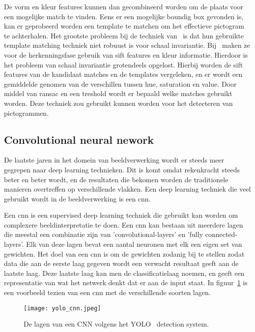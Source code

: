             De vorm en kleur features kunnen dan gecombineerd worden om de plaats voor een mogelijke match te vinden. Eens er een mogelijke boundig box gevonden is,
            kan er geprobeerd worden een template te matchen om het effectieve pictogram te achterhalen. Het grootste probleem bij de techniek van~\cite{Fang2003} is
            dat hun gebruikte template matching techniek niet robuust is voor schaal invariantie.
            Bij~\cite{Zabihi2017} maken ze voor de herkenningsfase gebruik van \gls{sift}\cite{Lowe1999} features en kleur informatie.
            Hierdoor is het probleem van schaal invariantie grotendeels opgelost.
            Hierbij worden de \gls{sift} features van de kandidaat matches en de templates vergeleken, en er wordt een gemiddelde genomen van de verschillen tussen hue, saturation en value.
            Door middel van \gls{ransac} en een treshold wordt er bepaald welke matches gebruikt worden. Deze techniek zou gebruikt kunnen worden voor het detecteren van pictogrammen.

        
        \subsection{Convolutional neural nework} \label{sec:yolo}
            De laatste jaren in het domein van beeldverwerking wordt er steeds meer gegrepen naar deep learning technieken. Dit is komt omdat rekenkracht steeds beter en beter wordt, en de resultaten die bekomen worden
            de traditionele manieren overtreffen op verschillende vlakken. Een deep learning techniek die veel gebruikt wordt in de beeldverwerking is een \gls{cnn}.

            Een \gls{cnn} is een supervised deep learning techniek die gebruikt kan worden om complexere beeldinterpretatie te doen.
            Een \gls{cnn} kan bestaan uit meerdere lagen die meestal een combinatie zijn van 'convolutional-layers' en 'fully connected-layers'. Elk van deze lagen bevat een aantal neuronen met elk een eigen set van gewichten.
            Het doel van een \gls{cnn} is om de gewichten zodanig bij te stellen zodat data die aan de eerste laag gegeven wordt een verwacht resultaat geeft aan de laatste laag. 
            Deze laatste laag kan men de classificatielaag noemen, en geeft een representatie van wat het netwerk denkt dat er aan de input staat. In figuur~\ref{fig:yolo_cnn} is een voorbeeld tezien van een \gls{cnn} met de verschillende soorten lagen.

            \begin{figure}[!htb]
                \centering
                \texttt{[image: yolo\_cnn.jpeg]}
                \caption{De lagen van een CNN volgens het YOLO~\cite{Redmon_2016} detection system.}
                \label{fig:yolo_cnn}
            \end{figure}

